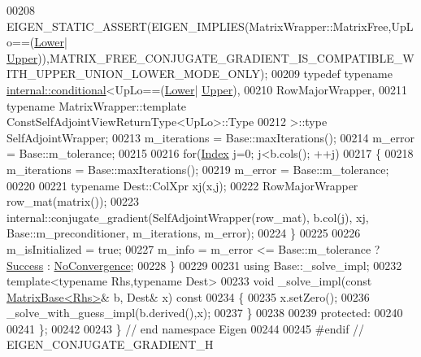 \begin{DoxyCode}
00208     EIGEN\_STATIC\_ASSERT(EIGEN\_IMPLIES(MatrixWrapper::MatrixFree,UpLo==(\hyperlink{group__enums_gga39e3366ff5554d731e7dc8bb642f83cda891792b8ed394f7607ab16dd716f60e6}{Lower}|
      \hyperlink{group__enums_gga39e3366ff5554d731e7dc8bb642f83cda6bcb58be3b8b8ec84859ce0c5ac0aaec}{Upper})),MATRIX\_FREE\_CONJUGATE\_GRADIENT\_IS\_COMPATIBLE\_WITH\_UPPER\_UNION\_LOWER\_MODE\_ONLY);
00209     \textcolor{keyword}{typedef} \textcolor{keyword}{typename} \hyperlink{struct_eigen_1_1internal_1_1conditional}{internal::conditional}<UpLo==(\hyperlink{group__enums_gga39e3366ff5554d731e7dc8bb642f83cda891792b8ed394f7607ab16dd716f60e6}{Lower}|
      \hyperlink{group__enums_gga39e3366ff5554d731e7dc8bb642f83cda6bcb58be3b8b8ec84859ce0c5ac0aaec}{Upper}),
00210                                            RowMajorWrapper,
00211                                            \textcolor{keyword}{typename} MatrixWrapper::template 
      ConstSelfAdjointViewReturnType<UpLo>::Type
00212                                           >::type SelfAdjointWrapper;
00213     m\_iterations = Base::maxIterations();
00214     m\_error = Base::m\_tolerance;
00215 
00216     \textcolor{keywordflow}{for}(\hyperlink{namespace_eigen_a62e77e0933482dafde8fe197d9a2cfde}{Index} j=0; j<b.cols(); ++j)
00217     \{
00218       m\_iterations = Base::maxIterations();
00219       m\_error = Base::m\_tolerance;
00220 
00221       \textcolor{keyword}{typename} Dest::ColXpr xj(x,j);
00222       RowMajorWrapper row\_mat(matrix());
00223       internal::conjugate\_gradient(SelfAdjointWrapper(row\_mat), b.col(j), xj, Base::m\_preconditioner, 
      m\_iterations, m\_error);
00224     \}
00225 
00226     m\_isInitialized = \textcolor{keyword}{true};
00227     m\_info = m\_error <= Base::m\_tolerance ? \hyperlink{group__enums_gga85fad7b87587764e5cf6b513a9e0ee5ea52581b035f4b59c203b8ff999ef5fcea}{Success} : \hyperlink{group__enums_gga85fad7b87587764e5cf6b513a9e0ee5eaba1c8763d1179778070f365ecc4157a8}{NoConvergence};
00228   \}
00229   
00231   \textcolor{keyword}{using} Base::\_solve\_impl;
00232   \textcolor{keyword}{template}<\textcolor{keyword}{typename} Rhs,\textcolor{keyword}{typename} Dest>
00233   \textcolor{keywordtype}{void} \_solve\_impl(\textcolor{keyword}{const} \hyperlink{group___core___module_class_eigen_1_1_matrix_base}{MatrixBase<Rhs>}& b, Dest& x)\textcolor{keyword}{ const}
00234 \textcolor{keyword}{  }\{
00235     x.setZero();
00236     \_solve\_with\_guess\_impl(b.derived(),x);
00237   \}
00238 
00239 \textcolor{keyword}{protected}:
00240 
00241 \};
00242 
00243 \} \textcolor{comment}{// end namespace Eigen}
00244 
00245 \textcolor{preprocessor}{#endif // EIGEN\_CONJUGATE\_GRADIENT\_H}
\end{DoxyCode}
